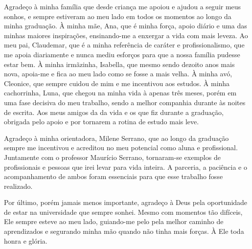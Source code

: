 \begin{agradecimentos}

Agradeço à minha família que desde criança me apoiou e ajudou a seguir meus sonhos, e sempre estiveram ao meu lado em todos os momentos ao longo da minha graduação. À minha mãe, Ana, que é minha força, apoio diário e uma das minhas maiores inspirações, ensinando-me a enxergar a vida com mais leveza. Ao meu pai, Claudemar, que é a minha referência de caráter e profissionalismo, que me apoia diariamente e nunca mediu esforços para que a nossa família pudesse estar bem. À minha irmãzinha, Isabella, que mesmo sendo dezoito anos mais nova, apoia-me e fica ao meu lado como se fosse a mais velha. À minha avó, Cleonice, que sempre cuidou de mim e me incentivou aos estudos. À minha cachorrinha, Luna, que chegou na minha vida à apenas três meses, porém em uma fase decisiva do meu trabalho, sendo a melhor companhia durante às noites de escrita. Aos meus amigos da da vida e os que fiz durante a graduação, obrigada pelo apoio e por tornarem a rotina de estudo mais leve.

Agradeço à minha orientadora, Milene Serrano, que ao longo da graduação sempre me incentivou e acreditou no meu potencial como aluna e profissional. Juntamente com o professor Maurício Serrano, tornaram-se exemplos de profissionais e pessoas que irei levar para vida inteira. A parceria, a paciência e o acompanhamento de ambos foram essenciais para que esse trabalho fosse realizado.

Por último, porém jamais menos importante, agradeço à Deus pela oportunidade de estar na universidade que sempre sonhei. Mesmo com momentos tão difíceis, Ele sempre esteve ao meu lado, guiando-me pelo pela melhor caminho de aprendizados e segurando minha mão quando não tinha mais forças. À Ele toda honra e glória.

\end{agradecimentos}